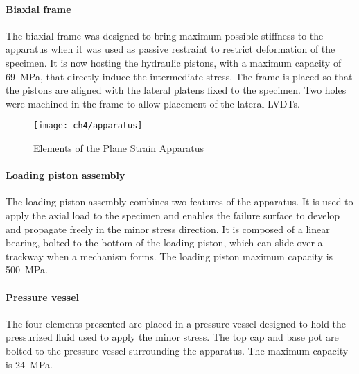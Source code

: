 \paragraph{Biaxial frame}
The biaxial frame was designed to bring maximum possible stiffness to the apparatus when it was used as passive restraint to restrict deformation of the specimen. It is now hosting the hydraulic pistons, with a maximum capacity of \SI{69}{MPa}, that directly induce the intermediate stress. The frame is placed so that the pistons are aligned with the lateral platens fixed to the specimen. Two holes were machined in the frame to allow placement of the lateral LVDTs.

\begin{figure}[!]
    \centering
    \texttt{[image: ch4/apparatus]}
    \captionsetup{justification=centering}
    \caption{Elements of the Plane Strain Apparatus}
    \label{fig4:apparatus}
\end{figure}

\paragraph{Loading piston assembly} 
The loading piston assembly combines two features of the apparatus. It is used to apply the axial load to the specimen and enables the failure surface to develop and propagate freely in the minor stress direction. It is composed of a linear bearing, bolted to the bottom of the loading piston, which can slide over a trackway when a mechanism forms. The loading piston maximum capacity is \SI{500}{MPa}. 


\paragraph{Pressure vessel} The four elements presented are placed in a pressure vessel designed to hold the pressurized fluid used to apply the minor stress. The top cap and base pot are bolted to the pressure vessel surrounding the apparatus. The maximum capacity is \SI{24}{MPa}.




